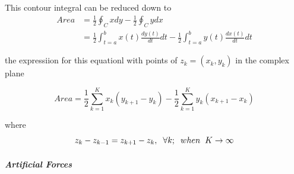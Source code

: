 \documentclass[twoside]{article}
\begin{document}
	This contour integral can be reduced down to
	\begin{align*}
Area &= \frac{1}{2} \oint_C xdy - \frac{1}{2} \oint_C ydx \\
&= \frac{1}{2} \int_{t=a}^{b} x(t)\frac{dy(t)}{dt}dt - \frac{1}{2} \int_{t=a}^{b}y(t)\frac{dx(t)}{dt}dt
	\end{align*}
		
			the expressiion for this equationl with points of  $z_k = (x_k,y_k)$ in the complex plane
			
			\begin{equation}
       Area = \frac{1}{2} \sum_{k=1}^{K} x_k(y_{k+1} - y_k) - \frac{1}{2} \sum_{k=1}^{K}y_k(x_{k+1} - x_k)
			\end{equation}
			
				where
				\begin{equation}
				z_k - z_{k-1} = z_{k+1} - z_k, \hspace{0.2cm}  \forall k ;  \hspace{0.2cm} when  \hspace{0.2cm} K \to\infty
				\end{equation}
 \subparagraph{Artificial Forces}\hspace{0pt} \\
\end{document}
